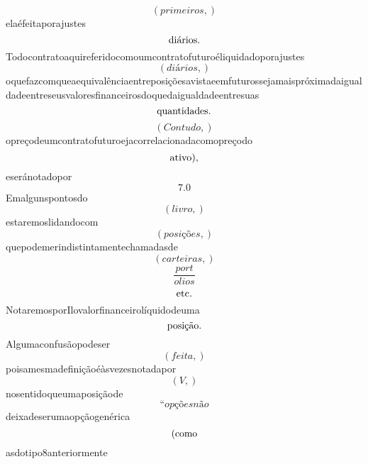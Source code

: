 \documentclass{article}
\begin{document}
\begin{equation}
\left( primeiros,\right)
\end{equation}elaéfeitaporajustes\begin{equation}
$diários.$
\end{equation}Todocontratoaquireferidocomoumcontratofuturoéliquidadoporajustes\begin{equation}
\left( diários,\right)
\end{equation}oquefazcomqueaequivalênciaentreposiçõesavistaeemfuturossejamaispróximadaigualdadeentreseusvaloresfinanceirosdoquedaigualdadeentresuas\begin{equation}
$quantidades.$
\end{equation}\begin{equation}
\left( Contudo,\right)
\end{equation}opreçodeumcontratofuturoejacorrelacionadacomopreçodo\begin{equation}
$ativo),$
\end{equation}eseránotadopor\begin{equation}
7.0
\end{equation}Emalgunspontosdo\begin{equation}
\left( livro,\right)
\end{equation}estaremoslidandocom\begin{equation}
\left( posições,\right)
\end{equation}quepodemerindistintamentechamadasde\begin{equation}
\left( carteiras,\right)
\end{equation}\begin{equation}
\frac{port}{olios}
\end{equation}\begin{equation}
$etc.$
\end{equation}NotaremosporIlovalorfinanceirolíquidodeuma\begin{equation}
$posição.$
\end{equation}Algumaconfusãopodeser\begin{equation}
\left( feita,\right)
\end{equation}poisamesmadefiniçãoéàsvezesnotadapor\begin{equation}
\left( V,\right)
\end{equation}nosentidoqueumaposiçãode\begin{equation}
“opçõesnão
\end{equation}deixadeserumaopçãogenérica\begin{equation}
$(como$
\end{equation}asdotipo8anteriormente\begin{equation}

\end{equation}
\end{document}
